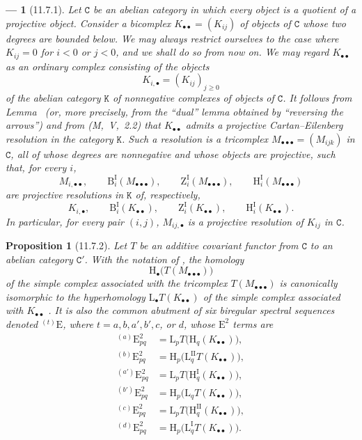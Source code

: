 \documentclass[oneside]{amsart}
\theoremstyle{ega-env-style}
\newtheorem*{env}{---}
\theoremstyle{ega-thm-env-style}
\newtheorem*{proposition}{Proposition}
\theoremstyle{ega-defn-env-style}
\def\cat{\mathtt}                   %
\def\geq{\geqslant}                 %
\def\HH{\mathrm{H}}                 %
\def\LL{\mathrm{L}}                 %
\newcommand{\oldpage}[2][]{{\marginnote{\normalfont{\textbf{#1}~|~#2}}}\ignorespaces}
\let\EGAOriginalLabel\label
\renewcommand{\label}[1]{\phantomsection\EGAOriginalLabel{#1}}
\begin{document}
\begin{env}[11.7.1]
\label{0.11.7.1}
Let $\cat{C}$ be an abelian category in which every object is a quotient of a
projective object.
Consider a bicomplex $K_{\bullet\bullet}=(K_{ij})$ of objects of $\cat{C}$ whose
two degrees are bounded below.
We may always restrict ourselves to the case where $K_{ij}=0$ for $i<0$ or
$j<0$, and we shall do so from now on.
We may regard $K_{\bullet\bullet}$ as an ordinary complex consisting of the
objects
\[
  K_{i,\bullet}=(K_{ij})_{j\geq 0}
\]
of the abelian category $\cat{K}$ of nonnegative complexes of objects of
$\cat{C}$.
It follows from Lemma~ (or, more precisely, from the
``dual'' lemma obtained by ``reversing the arrows'') and from (M,~V,~2.2)
that $K_{\bullet\bullet}$ admits a \emph{projective Cartan--Eilenberg
resolution} in the category $\cat{K}$.
Such a resolution is a tricomplex
$M_{\bullet\bullet\bullet}=(M_{ijk})$ in $\cat{C}$, all of whose degrees are
nonnegative and whose objects are projective, such that, for every $i$,
\[
  M_{i,\bullet\bullet},\qquad
  \mathrm{B}^{\mathrm{I}}_i(M_{\bullet\bullet\bullet}),\qquad
  \mathrm{Z}^{\mathrm{I}}_i(M_{\bullet\bullet\bullet}),\qquad
  \HH^{\mathrm{I}}_i(M_{\bullet\bullet\bullet})
\]
are projective resolutions in $\cat{K}$ of, respectively,
\[
  K_{i,\bullet},\qquad
  \mathrm{B}^{\mathrm{I}}_i(K_{\bullet\bullet}),\qquad
  \mathrm{Z}^{\mathrm{I}}_i(K_{\bullet\bullet}),\qquad
  \HH^{\mathrm{I}}_i(K_{\bullet\bullet}).
\]
In particular, for every pair $(i,j)$, $M_{ij,\bullet}$ is a projective
resolution of $K_{ij}$ in $\cat{C}$.
\end{env}

\begin{proposition}[11.7.2]
\label{0.11.7.2}
Let $T$ be an additive covariant functor from $\cat{C}$ to an abelian
category $\cat{C}'$.
With the notation of , the homology
\[
  \HH_\bullet\bigl(T(M_{\bullet\bullet\bullet})\bigr)
\]
of the simple complex associated with the tricomplex
$T(M_{\bullet\bullet\bullet})$ is canonically isomorphic to the
hyperhomology $\LL_\bullet T(K_{\bullet\bullet})$ of
\oldpage[0\textsubscript{III}]{42}
the simple complex associated with $K_{\bullet\bullet}$
.
It is also the common abutment of six biregular spectral sequences denoted
${}^{(t)}\mathrm{E}$, where $t=a,b,a',b',c$, or $d$, whose
$\mathrm{E}^2$ terms are
\[
\begin{aligned}
  {}^{(a)}\mathrm{E}^2_{pq}
    &= \LL_pT\bigl(\HH_q(K_{\bullet\bullet})\bigr),\\
  {}^{(b)}\mathrm{E}^2_{pq}
    &= \HH_p\bigl(\LL^{\mathrm{II}}_qT(K_{\bullet\bullet})\bigr),\\
  {}^{(a')}\mathrm{E}^2_{pq}
    &= \LL_pT\bigl(\HH^{\mathrm{I}}_q(K_{\bullet\bullet})\bigr),\\
  {}^{(b')}\mathrm{E}^2_{pq}
    &= \HH_p\bigl(\LL_qT(K_{\bullet\bullet})\bigr),\\
  {}^{(c)}\mathrm{E}^2_{pq}
    &= \LL_pT\bigl(\HH^{\mathrm{II}}_q(K_{\bullet\bullet})\bigr),\\
  {}^{(d)}\mathrm{E}^2_{pq}
    &= \HH_p\bigl(\LL^{\mathrm{I}}_qT(K_{\bullet\bullet})\bigr).
\end{aligned}
\]
\end{proposition}
\end{document}
